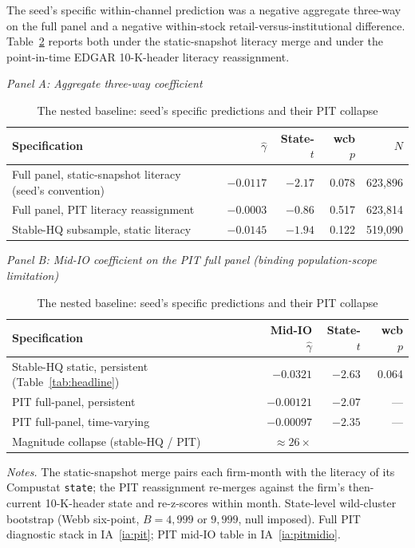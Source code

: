 The seed's specific within-channel prediction was a negative aggregate three-way on the full panel and a negative within-stock retail-versus-institutional difference. Table~\ref{tab:nested} reports both under the static-snapshot literacy merge and under the point-in-time EDGAR 10-K-header literacy reassignment.

\begin{table}[t]
\centering
\caption{The nested baseline: seed's specific predictions and their PIT collapse}
\label{tab:nested}
\footnotesize
\begin{minipage}{\textwidth}
\centering
\textit{Panel A: Aggregate three-way coefficient}\\[2pt]
\begin{tabular}{lrrrr}
\toprule
Specification & $\hat\gamma$ & State-$t$ & wcb $p$ & $N$ \\
\midrule
Full panel, static-snapshot literacy (seed's convention) & $-0.0117$ & $-2.17$ & 0.078 & 623,896 \\
Full panel, PIT literacy reassignment                    & $-0.0003$ & $-0.86$ & 0.517 & 623,814 \\
Stable-HQ subsample, static literacy                     & $-0.0145$ & $-1.94$ & 0.122 & 519,090 \\
\bottomrule
\end{tabular}

\medskip
\textit{Panel B: Mid-IO coefficient on the PIT full panel (binding population-scope limitation)}\\[2pt]
\begin{tabular}{lrrr}
\toprule
Specification & Mid-IO $\hat\gamma$ & State-$t$ & wcb $p$ \\
\midrule
Stable-HQ static, persistent (Table~\ref{tab:headline}) & $-0.0321$ & $-2.63$ & 0.064 \\
PIT full-panel, persistent                              & $-0.00121$ & $-2.07$ & --- \\
PIT full-panel, time-varying                            & $-0.00097$ & $-2.35$ & --- \\
Magnitude collapse (stable-HQ / PIT)                    & $\approx 26\times$ & & \\
\bottomrule
\end{tabular}
\end{minipage}

\medskip
{\footnotesize\textit{Notes.} The static-snapshot merge pairs each firm-month with the literacy of its Compustat \texttt{state}; the PIT reassignment re-merges against the firm's then-current 10-K-header state and re-z-scores within month. State-level wild-cluster bootstrap (Webb six-point, $B = 4{,}999$ or $9{,}999$, null imposed). Full PIT diagnostic stack in IA~\ref{ia:pit}; PIT mid-IO table in IA~\ref{ia:pitmidio}.}
\end{table}

